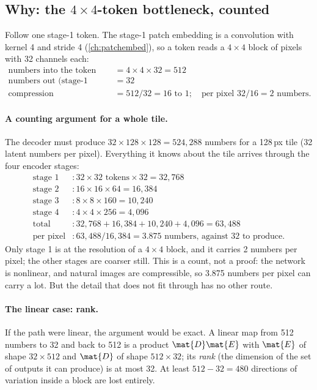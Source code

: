 \subsection{Why: the \texorpdfstring{$4\times4$}{4x4}-token bottleneck, counted}\label{sec:decoderwork:bottleneck}

Follow one stage-1 token. The stage-1 patch embedding is a convolution with kernel 4 and stride 4
(\cref{ch:patchembed}), so a token reads a $4\times4$ block of pixels with 32 channels each:
\begin{align*}
\text{numbers into the token} &= 4\times4\times32 = 512\\
\text{numbers out (stage-1 width)} &= 32\\
\text{compression} &= 512/32 = 16\text{ to }1;\quad\text{per pixel } 32/16 = 2 \text{ numbers}.
\end{align*}

\paragraph{A counting argument for a whole tile.} The decoder must produce $32\times128\times128=524{,}288$
numbers for a 128\,px tile (32 latent numbers per pixel). Everything it knows about the tile arrives through the
four encoder stages:
\begin{align*}
\text{stage 1} &: 32\times32\text{ tokens}\times32 = 32{,}768\\
\text{stage 2} &: 16\times16\times64 = 16{,}384\\
\text{stage 3} &: 8\times8\times160 = 10{,}240\\
\text{stage 4} &: 4\times4\times256 = 4{,}096\\
\text{total} &: 32{,}768+16{,}384+10{,}240+4{,}096 = 63{,}488\\
\text{per pixel} &: 63{,}488/16{,}384 = 3.875 \text{ numbers, against 32 to produce}.
\end{align*}
Only stage 1 is at the resolution of a $4\times4$ block, and it carries 2 numbers per pixel; the other stages are
coarser still. This is a count, not a proof: the network is nonlinear, and natural images are compressible, so
3.875 numbers per pixel can carry a lot. But the detail that does not fit through has no other route.

\paragraph{The linear case: rank.} If the path were linear, the argument would be exact. A linear map from 512
numbers to 32 and back to 512 is a product $\mat{D}\mat{E}$ with $\mat{E}$ of shape $32\times512$ and $\mat{D}$
of shape $512\times32$; its \emph{rank} (the dimension of the set of outputs it can
produce) is at most 32. At least $512-32=480$ directions of variation inside a block are lost entirely.

